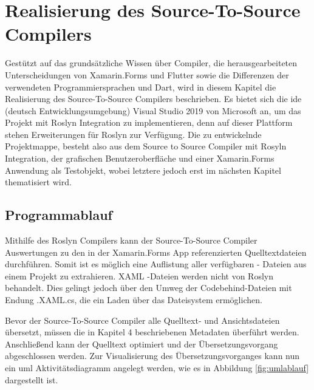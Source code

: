 \chapter{Realisierung des Source-To-Source Compilers}
\label{chap:Realisierung}
Gestützt auf das grundsätzliche Wissen über Compiler, die herausgearbeiteten Unterscheidungen von  Xamarin.Forms und Flutter sowie die Differenzen der verwendeten Programmiersprachen  \Csharp und Dart, wird in diesem Kapitel die Realisierung des Source-To-Source Compilers beschrieben.  Es bietet sich die \ac{ide} (deutsch Entwicklungsumgebung) Visual Studio 2019 von Microsoft an,  um das Projekt mit Roslyn Integration zu implementieren,  denn auf dieser Plattform stehen Erweiterungen für Roslyn zur Verfügung.
Die zu entwickelnde Projektmappe,  besteht also aus dem Source to Source Compiler mit Rosyln Integration, der grafischen Benutzeroberfläche und einer Xamarin.Forms
Anwendung als Testobjekt,  wobei letztere jedoch erst im nächsten Kapitel thematisiert wird.


\section{Programmablauf}
Mithilfe des Roslyn Compilers kann der Source-To-Source Compiler Auswertungen zu den in der Xamarin.Forms App referenzierten Quelltextdateien durchführen.  Somit ist es
möglich eine Auflistung aller verfügbaren \Csharp - Dateien aus einem Projekt zu extrahieren.  XAML -Dateien werden nicht von Roslyn behandelt.  Dies gelingt jedoch über den Umweg der Codebehind-Dateien mit Endung .XAML.cs,  die ein Laden über das Dateisystem ermöglichen. 

Bevor der Source-To-Source Compiler alle Quelltext- und Ansichtsdateien übersetzt,  müssen die in Kapitel 4 beschriebenen Metadaten überführt werden.  Anschließend kann der Quelltext optimiert und der Übersetzungsvorgang abgeschlossen werden.  Zur Visualisierung des Übersetzungsvorganges kann nun ein \ac{uml}  Aktivitätsdiagramm angelegt werden, wie es in Abbildung \ref{fig:umlablauf} dargestellt ist.

